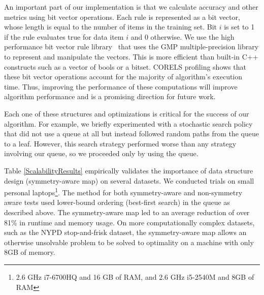 \documentclass[format=sigconf]{acmart}
\begin{document}
An important part of our implementation is that we calculate accuracy and other metrics using bit vector operations.
Each rule is represented as a bit vector, whose length is equal to the number of items in the training set. 
Bit $i$ is set to 1 if the rule evaluates true for data item $i$ and 0 otherwise.
We use the high performance bit vector rule library~\cite{YangRuSe16}
that uses the GMP multiple-precision library to represent and manipulate the vectors.
This is more efficient than built-in C++ constructs such as a vector of bools or a bitset.
CORELS profiling shows that these bit vector operations account for
the majority of algorithm's execution time.
Thus, improving the performance of these computations will improve algorithm performance and is a promising direction for future work.


Each one of these structures and optimizations is critical for the success of our algorithm.
For example, we briefly experimented with a stochastic search policy that did not use a queue at all but instead followed random paths from the queue to a leaf.
However, this search strategy performed worse than any strategy involving our queue, so we proceeded only by using the queue.

Table \ref{ScalabilityResults} empirically validates the importance of data structure design (symmetry-aware map) on several datasets.
We conducted trials on small personal laptops\footnote{2.6 GHz i7-6700HQ and 16 GB of RAM, and 2.6 GHz i5-2540M and 8GB of RAM}.
The method for both symmetry-aware and non-symmetry aware tests used lower-bound ordering (best-first search) in the queue as described above.
The symmetry-aware map led to an average reduction of over 81\% in runtime and memory usage. 
On more computationally complex datasets, such as the NYPD stop-and-frisk dataset, the symmetry-aware map allows an otherwise unsolvable problem to be solved to optimality on a machine with only 8GB of memory.
\end{document}
